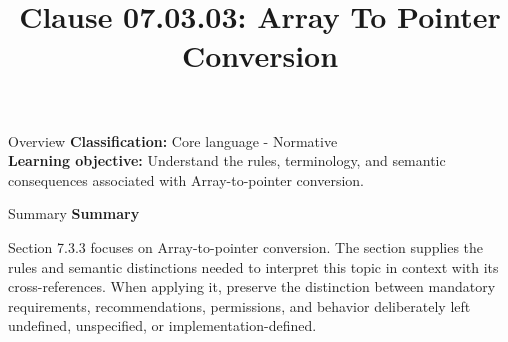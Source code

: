\documentclass[10pt,letterpaper]{article}
\title{Clause 07.03.03: Array To Pointer Conversion}
\author{}
\date{}
\begin{document}
\maketitle
\begin{CornellOverviewBox}{Overview}
\textbf{Classification:} Core language - Normative\\[2pt]
\textbf{Learning objective:} Understand the rules, terminology, and semantic consequences associated with Array-to-pointer conversion.
\end{CornellOverviewBox}\begin{CornellSummaryBox}{Summary}
{\sffamily\bfseries\color{Accent} Summary}\par\vspace{3pt}Section 7.3.3 focuses on Array-to-pointer conversion. The section supplies the rules and semantic distinctions needed to interpret this topic in context with its cross-references. When applying it, preserve the distinction between mandatory requirements, recommendations, permissions, and behavior deliberately left undefined, unspecified, or implementation-defined.
\end{CornellSummaryBox}
\end{document}
